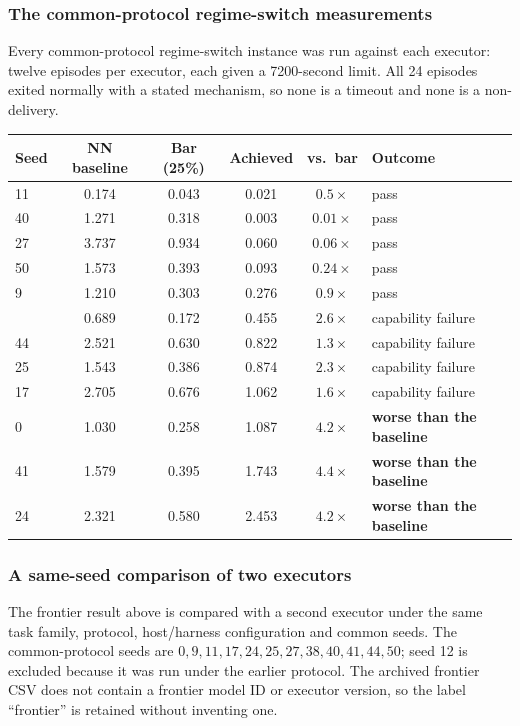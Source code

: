 \documentclass[11pt]{article}
\theoremstyle{definition}
\begin{document}
\subsubsection{The common-protocol regime-switch measurements}

Every common-protocol regime-switch instance was run against each executor: twelve episodes per executor, each given a 7200-second limit. All 24 episodes exited normally with a stated mechanism, so none is a timeout and none is a non-delivery.

\begin{table}[h]
\centering\small
\begin{tabularx}{\textwidth}{@{}lccccY@{}}
\toprule
Seed & NN baseline & Bar (25\%) & Achieved & vs.\ bar & Outcome \\
 & 0.174 & 0.043 & 0.021 & $0.5\times$ & pass \\
40 & 1.271 & 0.318 & 0.003 & $0.01\times$ & pass \\
27 & 3.737 & 0.934 & 0.060 & $0.06\times$ & pass \\
50 & 1.573 & 0.393 & 0.093 & $0.24\times$ & pass \\
9  & 1.210 & 0.303 & 0.276 & $0.9\times$ & pass \\
 & 0.689 & 0.172 & 0.455 & $2.6\times$ & capability failure \\
44 & 2.521 & 0.630 & 0.822 & $1.3\times$ & capability failure \\
25 & 1.543 & 0.386 & 0.874 & $2.3\times$ & capability failure \\
17 & 2.705 & 0.676 & 1.062 & $1.6\times$ & capability failure \\
0  & 1.030 & 0.258 & 1.087 & $4.2\times$ & \textbf{worse than the baseline} \\
41 & 1.579 & 0.395 & 1.743 & $4.4\times$ & \textbf{worse than the baseline} \\
24 & 2.321 & 0.580 & 2.453 & $4.2\times$ & \textbf{worse than the baseline} \\
\bottomrule
\end{tabularx}
\end{table}

\subsubsection{A same-seed comparison of two executors}
The frontier result above is compared with a second executor under the same
task family, protocol, host/harness configuration and common seeds. The common-protocol
seeds are $0,9,11,17,24,25,27,38,40,41,44,50$; seed 12 is excluded because it was run
under the earlier protocol. The archived frontier CSV does not contain a frontier model
ID or executor version, so the label ``frontier'' is retained without inventing one.
\end{document}
